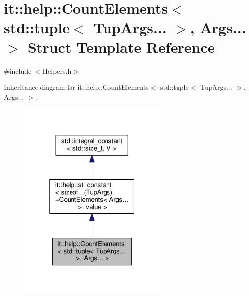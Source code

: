 \hypertarget{structit_1_1help_1_1CountElements_3_01std_1_1tuple_3_01TupArgs_8_8_8_01_4_00_01Args_8_8_8_01_4}{}\section{it\+:\+:help\+:\+:Count\+Elements$<$ std\+:\+:tuple$<$ Tup\+Args... $>$, Args... $>$ Struct Template Reference}
\label{structit_1_1help_1_1CountElements_3_01std_1_1tuple_3_01TupArgs_8_8_8_01_4_00_01Args_8_8_8_01_4}


{\ttfamily \#include $<$Helpers.\+h$>$}



Inheritance diagram for it\+:\+:help\+:\+:Count\+Elements$<$ std\+:\+:tuple$<$ Tup\+Args... $>$, Args... $>$\+:\nopagebreak
\begin{figure}[H]
\begin{center}
\leavevmode
\includegraphics[width=208pt]{structit_1_1help_1_1CountElements_3_01std_1_1tuple_3_01TupArgs_8_8_8_01_4_00_01Args_8_8_8_01_4__inherit__graph}
\end{center}
\end{figure}


